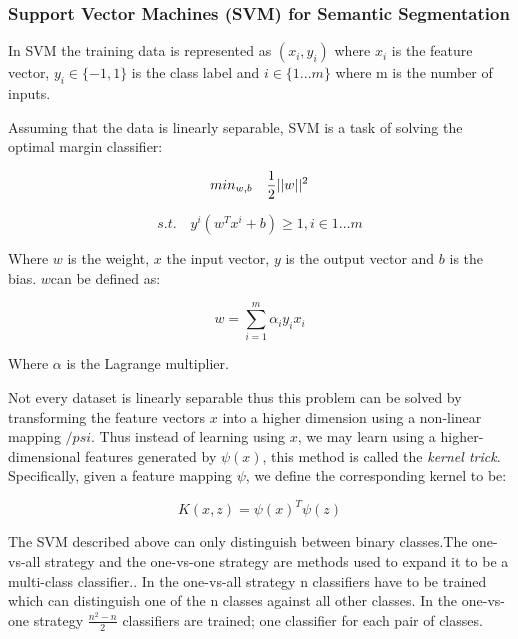 \subsubsection{Support Vector Machines (SVM) for Semantic Segmentation}

In SVM the training data is represented as $(x_i,y_i)$ where $x_i$ is the feature vector, $y_i \in \{-1,1\}$ is the class label and $i \in \{1...m\}$ where m is the number of inputs.

Assuming that the data is linearly separable, SVM is a task of solving the optimal margin classifier:

\begin{equation}
    min_{w,b} \quad \frac{1}{2}||w||^2 \\
\end{equation}

\begin{equation}
    s.t. \quad y^{i}(w^T x^i +b)\geqslant 1, i \in {1...m}
\end{equation}

\vspace{0.1cm}

Where $w$ is the weight, $x$ the input vector, $y$ is the output vector and $b$ is the bias. $w$can be defined as:

\begin{equation}
    w = \sum_{i=1}^m \alpha_i y_i x_i
\end{equation}

Where $\alpha$ is the Lagrange multiplier.

Not every dataset is linearly separable thus this problem can be solved by transforming the feature vectors $x$ into a higher dimension using a non-linear mapping $/psi$. Thus instead of learning using $x$, we may learn using a higher-dimensional features generated by $\psi(x)$, this method is called the \textit{kernel trick}. Specifically, given a feature mapping $\psi$, we define the corresponding kernel to be:    

\begin{equation}
    K(x,z)=\psi(x)^T\psi(z)
\end{equation}

The SVM described above can only distinguish between binary classes.The one-vs-all strategy and the one-vs-one strategy are methods used to expand it to be a multi-class classifier.. In the one-vs-all strategy n classifiers have to be trained which can distinguish one of the n classes against all other classes. In the one-vs-one strategy $\frac{n^2-n}{2}$ classifiers are trained; one classifier for each pair of classes.

